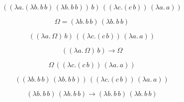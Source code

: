 \documentclass{article}
\begin{document}
\[
((\lambda a.(\lambda b.\, b\, b)\, (\lambda b.\, b\, b))\, b)\,
((\lambda c.(c\, b))\, (\lambda a.\, a))
\]

\[
\Omega = (\lambda b.\, b\, b)\, (\lambda b.\, b\, b)
\]

\[
((\lambda a.\, \Omega)\, b)\,
((\lambda c.(c\, b))\, (\lambda a.\, a))
\]

\[
((\lambda a.\, \Omega)\, b)
\to
\Omega
\]

\[
\Omega\, ((\lambda c.(c\, b))\, (\lambda a.\, a))
\]

\[
((\lambda b.\, b\, b)\, (\lambda b.\, b\, b))\,
((\lambda c.(c\, b))\, (\lambda a.\, a))
\]

\[
(\lambda b.\, b\, b)\, (\lambda b.\, b\, b)
\to
(\lambda b.\, b\, b)\, (\lambda b.\, b\, b)
\]
\end{document}
